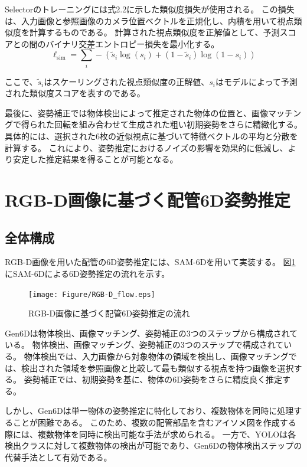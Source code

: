 Selectorのトレーニングには式2.2に示した類似度損失が使用される。
この損失は、入力画像と参照画像のカメラ位置ベクトルを正規化し、内積を用いて視点類似度を計算するものである。
計算された視点類似度を正解値として、予測スコアとの間のバイナリ交差エントロピー損失を最小化する。
\begin{equation}
	\ell_{\text{sim}} = \sum_{i} - \left( \tilde{s}_i \log(s_i) + (1 - \tilde{s}_i) \log(1 - s_i) \right)
	\tag{2.2}
\end{equation}
	
ここで、\(\tilde{s}_i\)はスケーリングされた視点類似度の正解値、\(s_i\)はモデルによって予測された類似度スコアを表すのである。

最後に、姿勢補正では物体検出によって推定された物体の位置と、画像マッチングで得られた回転を組み合わせて生成された粗い初期姿勢をさらに精緻化する。
具体的には、選択された6枚の近似視点に基づいて特徴ベクトルの平均と分散を計算する。
これにより、姿勢推定におけるノイズの影響を効果的に低減し、より安定した推定結果を得ることが可能となる。


\section{RGB-D画像に基づく配管6D姿勢推定}
\subsection{全体構成}
RGB-D画像を用いた配管の6D姿勢推定には、SAM-6Dを用いて実装する。
図\ref{fig:f6}にSAM-6Dによる6D姿勢推定の流れを示す。
\begin{figure}[htbt]
	\centering
	 \texttt{[image: Figure/RGB-D\_flow.eps]}
	 \caption{RGB-D画像に基づく配管6D姿勢推定の流れ}
	 \label{fig:f6}
\end{figure}

Gen6Dは物体検出、画像マッチング、姿勢補正の3つのステップから構成されている。
物体検出、画像マッチング、姿勢補正の3つのステップで構成されている。
物体検出では、入力画像から対象物体の領域を検出し、画像マッチングでは、検出された領域を参照画像と比較して最も類似する視点を持つ画像を選択する。
姿勢補正では、初期姿勢を基に、物体の6D姿勢をさらに精度良く推定する。

しかし、Gen6Dは単一物体の姿勢推定に特化しており、複数物体を同時に処理することが困難である。
このため、複数の配管部品を含むアイソメ図を作成する際には、複数物体を同時に検出可能な手法が求められる。
一方で、YOLOは各検出クラスに対して複数物体の検出が可能であり、Gen6Dの物体検出ステップの代替手法として有効である。

